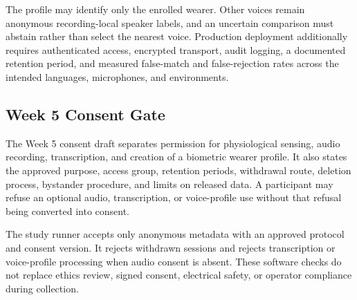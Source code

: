 The profile may identify only the enrolled wearer. Other voices remain anonymous recording-local speaker labels, and an uncertain comparison must abstain rather than select the nearest voice. Production deployment additionally requires authenticated access, encrypted transport, audit logging, a documented retention period, and measured false-match and false-rejection rates across the intended languages, microphones, and environments.

\subsection{Week 5 Consent Gate}
\label{sec:week5-consent-gate}

The Week 5 consent draft separates permission for physiological sensing, audio recording, transcription, and creation of a biometric wearer profile. It also states the approved purpose, access group, retention periods, withdrawal route, deletion process, bystander procedure, and limits on released data. A participant may refuse an optional audio, transcription, or voice-profile use without that refusal being converted into consent.

The study runner accepts only anonymous metadata with an approved protocol and consent version. It rejects withdrawn sessions and rejects transcription or voice-profile processing when audio consent is absent. These software checks do not replace ethics review, signed consent, electrical safety, or operator compliance during collection.
